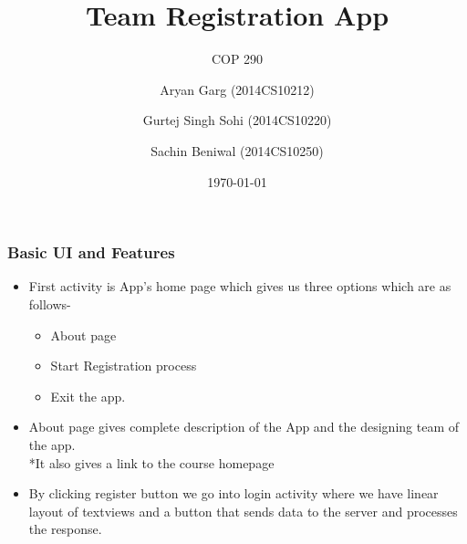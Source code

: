 \documentclass{beamer}
\title[Short title]{\Large{Team Registration App}} %
\subtitle{COP 290}
\author{Aryan Garg (2014CS10212) \\ \and Gurtej Singh Sohi (2014CS10220) \\ \and Sachin Beniwal (2014CS10250)} %
\institute[IIT] %
{
\large{IIT Delhi} \\ %
\medskip
\textit{} %
}
\date{\today} %
\begin{document}
\begin{frame}
\titlepage %
\end{frame}





\begin{frame}
\frametitle{\hspace{4cm}Basic UI and Features}
\begin{itemize}
\item First activity is App's home page which gives us three options which are as follows- 
\begin{itemize}
\item About page 
\item Start Registration process  
\item Exit the app.
\end{itemize}
\item About page  gives complete description of the App and the designing  team of the app. 
 \\ *It also gives a link to the course homepage       
 \item By clicking register button we go into login activity where we have linear layout of textviews and a button that sends data to the server and processes the response. 
\end{itemize}
\end{frame}
\end{document}

